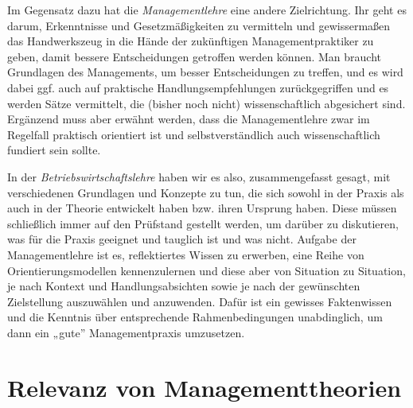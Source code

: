 \documentclass[
  letterpaper,
]{book}
\begin{document}
Im Gegensatz dazu hat die \emph{Managementlehre} eine andere
Zielrichtung. Ihr geht es darum, Erkenntnisse und Gesetzmäßigkeiten zu
vermitteln und gewissermaßen das Handwerkszeug in die Hände der
zukünftigen Managementpraktiker zu geben, damit bessere Entscheidungen
getroffen werden können. Man braucht Grundlagen des Managements, um
besser Entscheidungen zu treffen, und es wird dabei ggf. auch auf
praktische Handlungsempfehlungen zurückgegriffen und es werden Sätze
vermittelt, die (bisher noch nicht) wissenschaftlich abgesichert sind.
Ergänzend muss aber erwähnt werden, dass die Managementlehre zwar im
Regelfall praktisch orientiert ist und selbstverständlich auch
wissenschaftlich fundiert sein sollte.

In der \emph{Betriebswirtschaftslehre} haben wir es also,
zusammengefasst gesagt, mit verschiedenen Grundlagen und Konzepte zu
tun, die sich sowohl in der Praxis als auch in der Theorie entwickelt
haben bzw. ihren Ursprung haben. Diese müssen schließlich immer auf den
Prüfstand gestellt werden, um darüber zu diskutieren, was für die Praxis
geeignet und tauglich ist und was nicht. Aufgabe der Managementlehre ist
es, reflektiertes Wissen zu erwerben, eine Reihe von
Orientierungsmodellen kennenzulernen und diese aber von Situation zu
Situation, je nach Kontext und Handlungsabsichten sowie je nach der
gewünschten Zielstellung auszuwählen und anzuwenden. Dafür ist ein
gewisses Faktenwissen und die Kenntnis über entsprechende
Rahmenbedingungen unabdinglich, um dann ein „gute'' Managementpraxis
umzusetzen.

\section{Relevanz von
Managementtheorien}\label{relevanz-managementtheorien}
\end{document}
